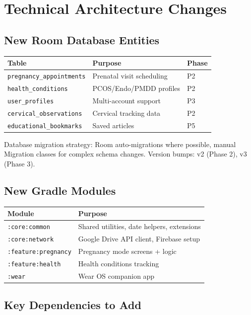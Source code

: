 \documentclass[12pt,a4paper]{article}
\begin{document}
\section{Technical Architecture Changes}

\subsection{New Room Database Entities}

\begin{tabularx}{\textwidth}{lXl}
\toprule
\textbf{Table} & \textbf{Purpose} & \textbf{Phase} \\
\midrule
\texttt{pregnancy\_appointments} & Prenatal visit scheduling & P2 \\
\texttt{health\_conditions} & PCOS/Endo/PMDD profiles & P2 \\
\texttt{user\_profiles} & Multi-account support & P3 \\
\texttt{cervical\_observations} & Cervical tracking data & P2 \\
\texttt{educational\_bookmarks} & Saved articles & P5 \\
\bottomrule
\end{tabularx}

Database migration strategy: Room auto-migrations where possible, manual Migration classes for complex schema changes. Version bumps: v2 (Phase 2), v3 (Phase 3).

\subsection{New Gradle Modules}

\begin{tabularx}{\textwidth}{lX}
\toprule
\textbf{Module} & \textbf{Purpose} \\
\midrule
\texttt{:core:common} & Shared utilities, date helpers, extensions \\
\texttt{:core:network} & Google Drive API client, Firebase setup \\
\texttt{:feature:pregnancy} & Pregnancy mode screens + logic \\
\texttt{:feature:health} & Health conditions tracking \\
\texttt{:wear} & Wear OS companion app \\
\bottomrule
\end{tabularx}

\subsection{Key Dependencies to Add}
\end{document}
